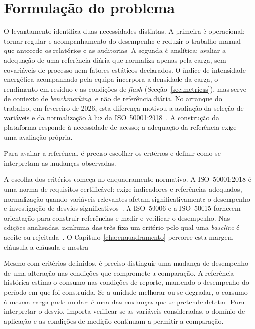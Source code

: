 \section{Formulação do problema}
\label{sec:problema}

O levantamento identifica duas necessidades distintas. A primeira é
operacional: tornar regular o acompanhamento do desempenho e reduzir
o trabalho manual que antecede os relatórios e as auditorias. A
segunda é analítica: avaliar a adequação de uma referência diária que
normaliza apenas pela carga, sem covariáveis de processo nem fatores
estáticos declarados. O índice de intensidade energética acompanhado
pela equipa incorpora a densidade da carga, o rendimento em resíduo e
as condições de \emph{flash} (Secção~\ref{sec:metricas}), mas serve de
contexto de \emph{benchmarking}, e não de referência diária. No arranque
do trabalho, em fevereiro de 2026, esta diferença motivou a avaliação
da seleção de variáveis e da normalização à luz da
ISO~50001:2018~\cite[\S6.4--6.5]{ISO50001_2018}. A construção da
plataforma responde à necessidade de acesso; a adequação da referência
exige uma avaliação própria.

Para avaliar a referência, é preciso escolher os critérios e
definir como se interpretam as mudanças observadas.

A escolha dos critérios começa no enquadramento normativo. A ISO~50001:2018 é uma
norma de requisitos certificável: exige indicadores e referências
adequados, normalização quando variáveis relevantes afetam
significativamente o desempenho e investigação de desvios
significativos~\cite{ISO50001_2018}. A ISO~50006 e a ISO~50015 fornecem
orientação para construir referências e medir e verificar o desempenho.
Nas edições analisadas, nenhuma das três fixa um critério pelo qual uma
\emph{baseline} é aceite ou rejeitada~\cite{ISO50006_2014,ISO50015_2014}.
 O Capítulo~\ref{cha:enquadramento} percorre esta margem
cláusula a cláusula e mostra 

Mesmo com critérios definidos, é preciso distinguir uma mudança de
desempenho de uma alteração nas condições que compromete a comparação.
A referência histórica estima o consumo nas condições de reporte,
mantendo o desempenho do período em que foi construída. Se a unidade
melhorar ou se degradar, o consumo à mesma carga pode mudar: é uma das
mudanças que se pretende detetar. Para interpretar o desvio, importa verificar se as variáveis consideradas,
o domínio de aplicação e as condições de medição continuam a permitir a
comparação. 

